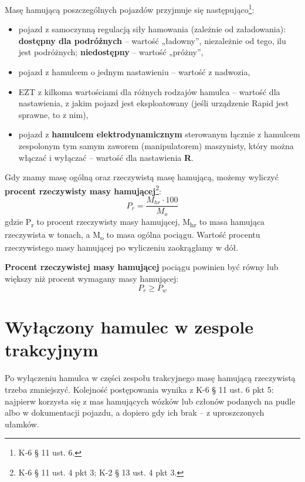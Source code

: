 Masę hamującą poszczególnych pojazdów przyjmuje się następująco\footnote{K-6 § 11 ust. 6.}:
\begin{itemize}
	\item pojazd z samoczynną regulacją siły hamowania (zależnie od załadowania): \textbf{dostępny dla podróżnych} – wartość „ładowny”, niezależnie od tego, ilu jest podróżnych; \textbf{niedostępny} – wartość „próżny”,
	\item pojazd z hamulcem o jednym nastawieniu – wartość z nadwozia,
	\item EZT z kilkoma wartościami dla różnych rodzajów hamulca – wartość dla nastawienia, z jakim pojazd jest eksploatowany (jeśli urządzenie Rapid jest sprawne, to z nim),
	\item pojazd z \textbf{hamulcem elektrodynamicznym} sterowanym łącznie z hamulcem zespolonym tym samym zaworem (manipulatorem) maszynisty, który można włączać i wyłączać – wartość dla nastawienia \textbf{R}.
\end{itemize}

Gdy znamy masę ogólną oraz rzeczywistą masę hamującą, możemy wyliczyć \textbf{procent rzeczywisty masy hamującej}\footnote{K-6 § 11 ust. 4 pkt 3; K-2 § 13 ust. 4 pkt 3.}:
\[  P_{r}=\frac{M_{hr} \cdot 100}{M_{o}}   \label{def:pr} \]
gdzie P\textsubscript{r} to procent rzeczywisty masy hamującej, M\textsubscript{hr} to masa hamująca rzeczywista w tonach, a M\textsubscript{o} to masa ogólna pociągu. Wartość procentu rzeczywistego masy hamującej po wyliczeniu zaokrąglamy w dół.

\textbf{Procent rzeczywistej masy hamującej} pociągu powinien być równy lub większy niż procent wymagany masy hamującej:
\[  P_{r} \ge P_{w}   \]

\section{Wyłączony hamulec w zespole trakcyjnym}

Po wyłączeniu hamulca w części zespołu trakcyjnego masę hamującą rzeczywistą trzeba zmniejszyć. Kolejność postępowania wynika z K-6 § 11 ust. 6 pkt 5: najpierw korzysta się z mas hamujących wózków lub członów podanych na pudle albo w dokumentacji pojazdu, a dopiero gdy ich brak – z uproszczonych ułamków.

